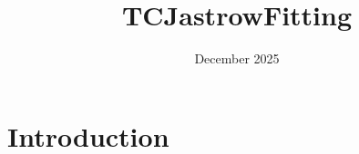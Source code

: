 \documentclass{article}
\title{TCJastrowFitting}
\author{}
\date{December 2025}
\begin{document}
\maketitle



\newpage


\newpage
\section{Introduction}
\end{document}
